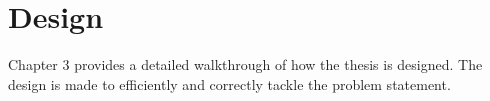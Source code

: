 \chapter{Design}
\label{ch:design}
Chapter 3 provides a detailed walkthrough of how the thesis is designed.
The design is made to efficiently and correctly tackle the problem statement.
